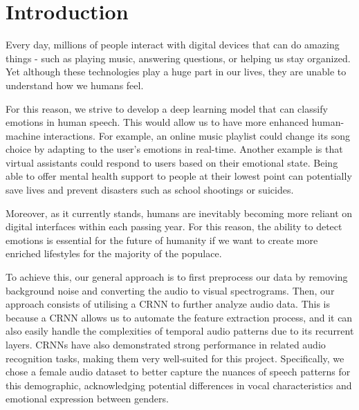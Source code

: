 \documentclass[../main.tex]{subfiles}
\begin{document}
\section{Introduction}
Every day, millions of people interact with digital devices that can do amazing 
things - such as playing music, answering questions, or helping us stay organized. 
Yet although these technologies play a huge part in our lives, they are unable to 
understand how we humans feel. 

For this reason, we strive to develop a deep learning model that can classify 
emotions in human speech. This would allow us to have more enhanced 
human-machine interactions. For example, an online music playlist could 
change its song choice by adapting to the user's emotions in real-time. Another 
example is that virtual assistants could respond to users based on their 
emotional state. Being able to offer mental health support to people at their 
lowest point can potentially save lives and prevent disasters such as school 
shootings or suicides.

Moreover, as it currently stands, humans are inevitably becoming more reliant on 
digital interfaces within each passing year. For this reason, the ability to
detect emotions is essential for the future of humanity if we want to create
more enriched lifestyles for the majority of the populace.

To achieve this, our general approach is to first preprocess our data by removing
background noise and converting the audio to visual spectrograms. Then, our approach
consists of utilising a CRNN to further analyze audio data. This is because a CRNN
allows us to automate the feature extraction process, and it can also easily handle
the complexities of temporal audio patterns due to its recurrent layers. CRNNs have
also demonstrated strong performance in related audio recognition tasks, making them
very well-suited for this project. Specifically, we chose a female audio dataset to
better capture the nuances of speech patterns for this demographic, acknowledging
potential differences in vocal characteristics and emotional expression between genders.
\end{document}
